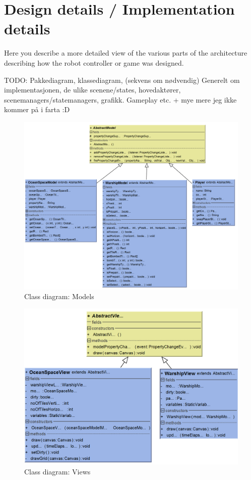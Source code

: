 \chapter{Design details / Implementation details}

Here you describe a more detailed view of the various parts of the 
architecture describing how the robot controller or game was designed.

TODO: Pakkediagram, klassediagram, (sekvens om nødvendig)
Generelt om implementasjonen, de ulike scenene/states, hovedaktører, scenemanagers/statemanagers, grafikk. Gameplay etc.  + mye mere jeg ikke kommer på i farta :D 


\begin{figure}[ht]
    \includegraphics[width=\textwidth, angle=90]{img/Class_Model.png}
    \caption{Class diagram: Models}
    \label{fig:DevelopmentView}
\end{figure}

\begin{figure}[ht]
    \includegraphics[width=\textwidth, angle=90]{img/Class_View.png}
    \caption{Class diagram: Views}
    \label{fig:DevelopmentView}
\end{figure}

